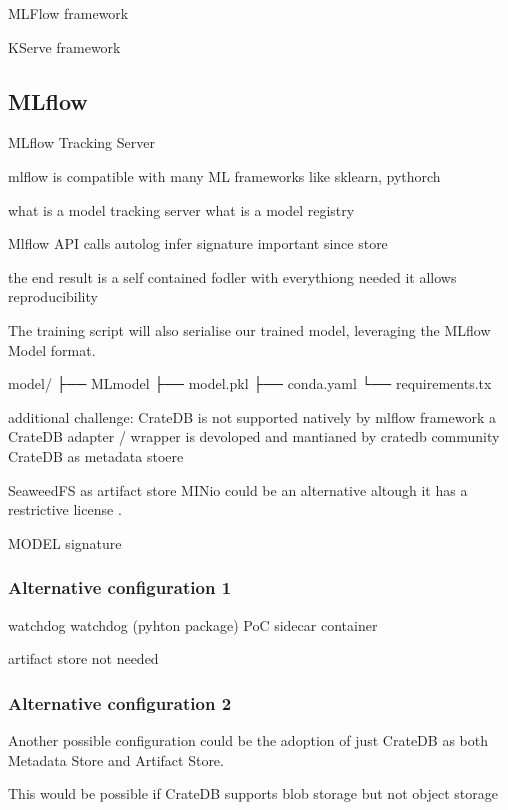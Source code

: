 MLFlow framework

KServe framework


\subsection{MLflow}



MLflow Tracking Server


mlflow is compatible with many ML frameworks like sklearn, pythorch


what is a model tracking server
what is a model registry



Mlflow API calls
autolog
infer signature 
important since store 

the end result is a self contained fodler with everythiong needed 
it allows reproducibility 

The training script will also serialise our trained model, leveraging the MLflow Model format.


model/
├── MLmodel
├── model.pkl
├── conda.yaml
└── requirements.tx


additional challenge: CrateDB is not supported natively by mlflow framework
a CrateDB adapter / wrapper is devoloped and mantianed by cratedb community
CrateDB as metadata stoere


SeaweedFS as artifact store
MINio could be an alternative altough it has a restrictive license \cite{minio_license}.



MODEL signature




\subsubsection{Alternative configuration 1}

watchdog
watchdog (pyhton package)
PoC
sidecar container

artifact store not needed

\subsubsection{Alternative configuration 2}

Another possible configuration could be the adoption of just CrateDB as both Metadata Store and Artifact Store.

This would be possible if
CrateDB supports blob storage but not object storage

